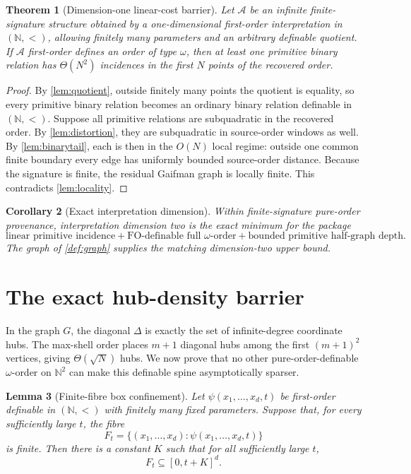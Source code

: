 \documentclass[11pt]{article}
\newtheorem{theorem}{Theorem}[section]
\newtheorem{lemma}[theorem]{Lemma}
\newtheorem{corollary}[theorem]{Corollary}
\theoremstyle{definition}
\newcommand{\N}{\mathbb N}
\newcommand{\FO}{\mathrm{FO}}
\begin{document}
\begin{theorem}[Dimension-one linear-cost barrier]\label{thm:d1}
Let $\mathcal A$ be an infinite finite-signature structure obtained by a one-dimensional first-order interpretation in $(\N,<)$, allowing finitely many parameters and an arbitrary definable quotient.  If $\mathcal A$ first-order defines an order of type $\omega$, then at least one primitive binary relation has $\Theta(N^2)$ incidences in the first $N$ points of the recovered order.
\end{theorem}

\begin{proof}
By \cref{lem:quotient}, outside finitely many points the quotient is equality, so every primitive binary relation becomes an ordinary binary relation definable in $(\N,<)$.  Suppose all primitive relations are subquadratic in the recovered order.  By \cref{lem:distortion}, they are subquadratic in source-order windows as well.  By \cref{lem:binarytail}, each is then in the $O(N)$ local regime: outside one common finite boundary every edge has uniformly bounded source-order distance.  Because the signature is finite, the residual Gaifman graph is locally finite.  This contradicts \cref{lem:locality}.
\end{proof}

\begin{corollary}[Exact interpretation dimension]\label{cor:dim}
Within finite-signature pure-order provenance, interpretation dimension two is the exact minimum for the package
\[
\text{linear primitive incidence}
+\FO\text{-definable full }\omega\text{-order}
+\text{bounded primitive half-graph depth}.
\]
The graph of \cref{def:graph} supplies the matching dimension-two upper bound.
\end{corollary}

\section{The exact hub-density barrier}

In the graph $G$, the diagonal $\Delta$ is exactly the set of infinite-degree coordinate hubs.  The max-shell order places $m+1$ diagonal hubs among the first $(m+1)^2$ vertices, giving $\Theta(\sqrt N)$ hubs.  We now prove that no other pure-order-definable $\omega$-order on $\N^2$ can make this definable spine asymptotically sparser.

\begin{lemma}[Finite-fibre box confinement]\label{lem:box}
Let $\psi(x_1,\dots,x_d,t)$ be first-order definable in $(\N,<)$ with finitely many fixed parameters.  Suppose that, for every sufficiently large $t$, the fibre
\[
F_t=\{(x_1,\dots,x_d):\psi(x_1,\dots,x_d,t)\}
\]
is finite.  Then there is a constant $K$ such that for all sufficiently large $t$,
\[
F_t\subseteq[0,t+K]^d.
\]
\end{lemma}
\end{document}
